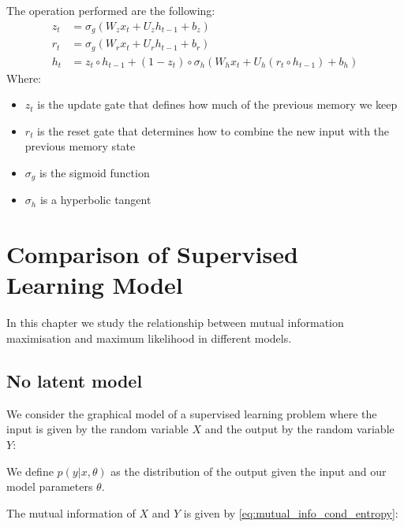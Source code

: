 \documentclass[10pt,oneside,openright]{report}
\begin{document}
The operation performed are the following:
\begin{align}
z_t &= \sigma_g(W_{z} x_t + U_{z} h_{t-1} + b_z) \\
r_t &= \sigma_g(W_{r} x_t + U_{r} h_{t-1} + b_r) \\
h_t &=  z_t \circ h_{t-1} + (1-z_t) \circ \sigma_h(W_{h} x_t + U_{h} (r_t \circ h_{t-1}) + b_h)
\end{align}
Where:
\begin{itemize}
 \item $z_t$ is the update gate that defines how much of the previous memory we keep
 \item $r_t$ is the reset gate that determines how to combine the new input with the previous memory state
\item  $\sigma_g$ is the sigmoid function
\item $\sigma_h$ is a hyperbolic tangent
\end{itemize}

\chapter{Comparison of Supervised Learning Model}

In this chapter we study the relationship between mutual information maximisation and maximum likelihood in different models.

\section{No latent model}

We consider the graphical model of a supervised learning problem where the input is given by the random variable $X$ and the output by the random variable $Y$:

\begin{figure}[H]
\centering
{}
\end{figure}

We define $p(y|x, \theta)$ as the distribution of the output given the input and our model parameters $\theta$.

The mutual information of $X$ and $Y$ is given by \ref{eq:mutual_info_cond_entropy}:
\end{document}
